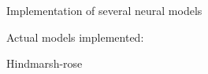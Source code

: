 \label{index_md__mnt_c_Users_sergi_Desktop_cositas_uni_TFG_README}%
%
Implementation of several neural models

Actual models implemented\+:


\begin{DoxyEnumerate}
\item Hindmarsh-\/rose 
\end{DoxyEnumerate}